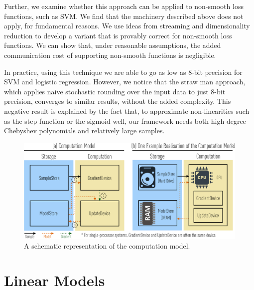 \documentclass{article}
\begin{document}
Further, we examine whether this approach can be applied to non-smooth loss functions, such as SVM. 
We find that the machinery described above does not apply, for fundamental reasons. 
We use ideas from streaming and dimensionality reduction to develop a variant that is provably correct for non-smooth loss functions. 
We can show that, under reasonable assumptions, the added communication cost of supporting non-smooth functions is negligible. 

\vspace{-0.5em}
In practice, using this technique we are
able to go as low as 8-bit precision for SVM and logistic regression. 
However, we notice that the straw man approach, which applies naive stochastic rounding over the input data to just 8-bit precision, converges to similar results, 
without the added complexity. 
This negative result is explained by the fact that, to approximate non-linearities such as the step function or the sigmoid well, our framework needs both high degree Chebyshev polynomials and relatively large samples. 

\begin{figure}[t]
\centering   
\includegraphics[scale=0.27]{compmodel-pdfcrop}
\vspace{-1em}
\caption{A schematic representation of the computation model.}
\vspace{-0.5em}
\label{fig:model}
\end{figure}


\vspace{-0.5em}
\section{Linear Models}
\end{document}
